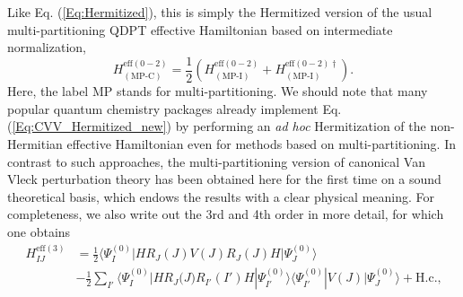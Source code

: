 Like Eq. (\ref{Eq:Hermitized}), this is simply the Hermitized version of the usual multi-partitioning QDPT effective Hamiltonian based on intermediate normalization,
	\begin{equation}
	\label{Eq:CVV_Hermitized_new}
	H_{({\text{MP-C}})}^{{\text{eff}}(0 - 2)} = \frac{1}{2}(H_{({\text{MP-I}})}^{{\text{eff}}(0 - 2)} + H{_{({\text{MP-I}})}^{{\text{eff}}(0 - 2)\dagger} }).
	\end{equation}
Here, the label MP stands for multi-partitioning. We should note that many popular quantum chemistry packages already implement Eq. (\ref{Eq:CVV_Hermitized_new}) by performing an \textit{ad hoc} Hermitization of the non-Hermitian effective Hamiltonian even for methods based on multi-partitioning. In contrast to such approaches, the multi-partitioning version of canonical Van Vleck perturbation theory has been obtained here for the first time on a sound theoretical basis, which endows the results with a clear physical meaning.
For completeness, we also write out the 3rd and 4th order in more detail, for which one obtains
	\begin{equation}
	\begin{aligned}
	H_{IJ}^{{\text{eff}}(3)} &= \frac{1}{2}\langle \Psi _I^{(0)}|H{R_J}(J)V(J){R_J}(J)H|\Psi _J^{(0)}\rangle  \\
	&- \frac{1}{2}\sum\limits_{I'} {\langle \Psi _I^{(0)}|H{R_J}(} J){R_{I'}}(I')H|\Psi _{I'}^{(0)}\rangle \langle \Psi _{I'}^{(0)}|V(J)|\Psi _J^{(0)}\rangle  + {\text{H}}{\text{.c}}{\text{.,}}
	\end{aligned}
	\end{equation}
